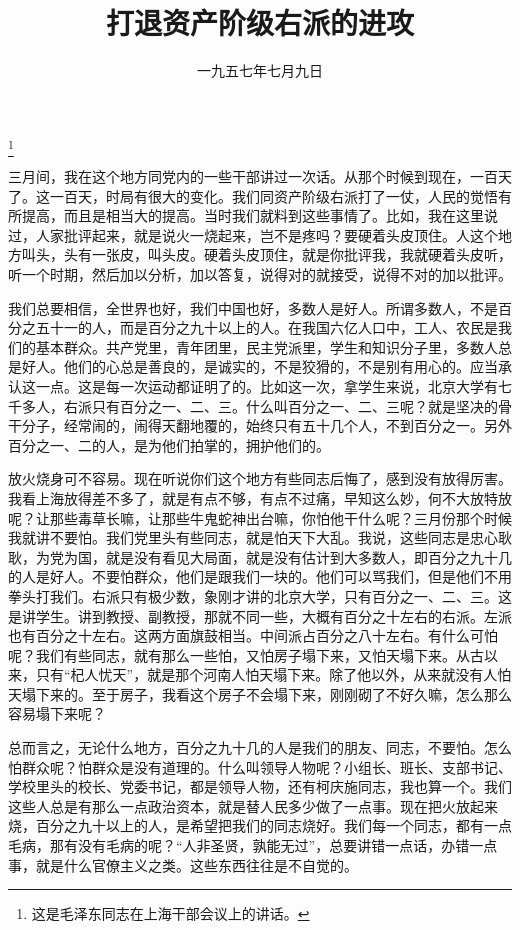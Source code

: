 
\title{打退资产阶级右派的进攻}
\date{一九五七年七月九日}
\thanks{这是毛泽东同志在上海干部会议上的讲话。}
\maketitle


三月间，我在这个地方同党内的一些干部讲过一次话。从那个时候到现在，一百天了。这一百天，时局有很大的变化。我们同资产阶级右派打了一仗，人民的觉悟有所提高，而且是相当大的提高。当时我们就料到这些事情了。比如，我在这里说过，人家批评起来，就是说火一烧起来，岂不是疼吗？要硬着头皮顶住。人这个地方叫头，头有一张皮，叫头皮。硬着头皮顶住，就是你批评我，我就硬着头皮听，听一个时期，然后加以分析，加以答复，说得对的就接受，说得不对的加以批评。

我们总要相信，全世界也好，我们中国也好，多数人是好人。所谓多数人，不是百分之五十一的人，而是百分之九十以上的人。在我国六亿人口中，工人、农民是我们的基本群众。共产党里，青年团里，民主党派里，学生和知识分子里，多数人总是好人。他们的心总是善良的，是诚实的，不是狡猾的，不是别有用心的。应当承认这一点。这是每一次运动都证明了的。比如这一次，拿学生来说，北京大学有七千多人，右派只有百分之一、二、三。什么叫百分之一、二、三呢？就是坚决的骨干分子，经常闹的，闹得天翻地覆的，始终只有五十几个人，不到百分之一。另外百分之一、二的人，是为他们拍掌的，拥护他们的。

放火烧身可不容易。现在听说你们这个地方有些同志后悔了，感到没有放得厉害。我看上海放得差不多了，就是有点不够，有点不过痛，早知这么妙，何不大放特放呢？让那些毒草长嘛，让那些牛鬼蛇神出台嘛，你怕他干什么呢？三月份那个时候我就讲不要怕。我们党里头有些同志，就是怕天下大乱。我说，这些同志是忠心耿耿，为党为国，就是没有看见大局面，就是没有估计到大多数人，即百分之九十几的人是好人。不要怕群众，他们是跟我们一块的。他们可以骂我们，但是他们不用拳头打我们。右派只有极少数，象刚才讲的北京大学，只有百分之一、二、三。这是讲学生。讲到教授、副教授，那就不同一些，大概有百分之十左右的右派。左派也有百分之十左右。这两方面旗鼓相当。中间派占百分之八十左右。有什么可怕呢？我们有些同志，就有那么一些怕，又怕房子塌下来，又怕天塌下来。从古以来，只有“杞人忧天”，就是那个河南人怕天塌下来。除了他以外，从来就没有人怕天塌下来的。至于房子，我看这个房子不会塌下来，刚刚砌了不好久嘛，怎么那么容易塌下来呢？

总而言之，无论什么地方，百分之九十几的人是我们的朋友、同志，不要怕。怎么怕群众呢？怕群众是没有道理的。什么叫领导人物呢？小组长、班长、支部书记、学校里头的校长、党委书记，都是领导人物，还有柯庆施同志，我也算一个。我们这些人总是有那么一点政治资本，就是替人民多少做了一点事。现在把火放起来烧，百分之九十以上的人，是希望把我们的同志烧好。我们每一个同志，都有一点毛病，那有没有毛病的呢？“人非圣贤，孰能无过”，总要讲错一点话，办错一点事，就是什么官僚主义之类。这些东西往往是不自觉的。

